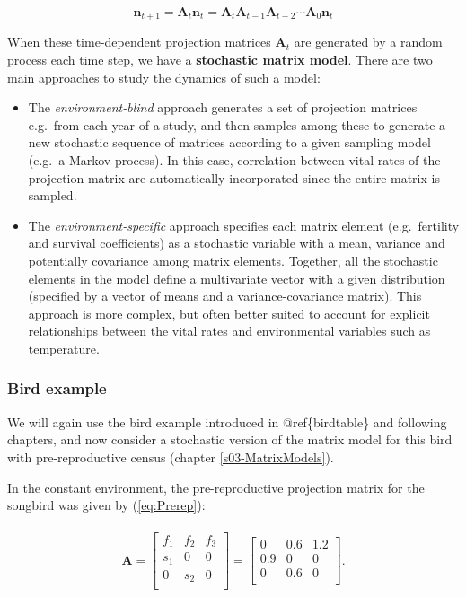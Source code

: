 \documentclass[
]{book}
\begin{document}
\[\mathbf{n}_{t+1}=\mathbf{A}_{t}\mathbf{n}_{t}=\mathbf{A}_{t}\mathbf{A}_{t-1}\mathbf{A}_{t-2}\cdots\mathbf{A}_{0}\mathbf{n}_{t}\]

When these time-dependent projection matrices \(\mathbf{A}_t\) are generated by a random process each time step, we have a \textbf{stochastic matrix model}. There are two main approaches to study the dynamics of such a model:

\begin{itemize}
\item
  The \emph{environment-blind} approach generates a set of projection matrices e.g.~from each year of a study, and then samples among these to generate a new stochastic sequence of matrices according to a given sampling model (e.g.~a Markov process). In this case, correlation between vital rates of the projection matrix are automatically incorporated since the entire matrix is sampled.
\item
  The \emph{environment-specific} approach specifies each matrix element (e.g.~fertility and survival coefficients) as a stochastic variable with a mean, variance and potentially covariance among matrix elements. Together, all the stochastic elements in the model define a multivariate vector with a given distribution (specified by a vector of means and a variance-covariance matrix). This approach is more complex, but often better suited to account for explicit relationships between the vital rates and environmental variables such as temperature.
\end{itemize}

\hypertarget{bird-example-16}{%
\subsubsection*{Bird example}\label{bird-example-16}}

We will again use the bird example introduced in @ref\{birdtable\} and following chapters, and now consider a stochastic version of the matrix model for this bird with pre-reproductive census (chapter \ref{s03-MatrixModels}).

In the constant environment, the pre-reproductive projection matrix for the songbird was given by (\eqref{eq:Prerep}):

\begin{align}
\begin{split}
\mathbf{A}=\left[\begin{matrix} f_1 & f_2 &f_3  \\ s_1 &0&0\\ 0 & s_2 &0  \\  \end{matrix}\right]=\left[\begin{matrix} 0 &0.6 &1.2  \\ 0.9 &0&0\\ 0 & 0.6 &0  \\  \end{matrix}\right].
\end{split}
\end{align}
\end{document}
